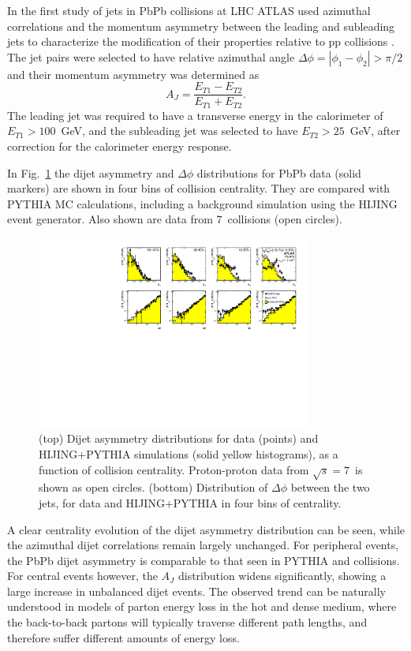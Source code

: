 In the first study of jets in PbPb collisions at LHC ATLAS used azimuthal correlations and the
momentum asymmetry between the leading and subleading jets to characterize the modification
of their properties relative to pp collisions \cite{Aad:2010bu}.
The jet pairs were selected to have relative azimuthal angle $\Delta \phi =|\phi_1-\phi_2| > \pi/2$
and their momentum asymmetry was determined as
\begin{equation}
A_J = \frac{E_{T1}-E_{T2}}{E_{T1}+E_{T2}}.
\end{equation}
The leading jet was required to have a transverse energy in the calorimeter of $E_{T1} > 100$~GeV,
and the subleading jet was selected to have $E_{T2} > 25$~GeV, after correction for
the calorimeter energy response.

In Fig.~\ref{fig:GR:final_4x2} the dijet asymmetry and $\Delta\phi$ distributions for PbPb data (solid markers)
are shown in four bins of collision centrality. They are compared with PYTHIA MC calculations, including a
background simulation using the HIJING event generator. Also shown are data from 7\TeV\
\pp collisions (open circles).
\begin{figure}[!thb]
\begin{center}
\includegraphics[width=0.8\textwidth]{jetfigures/final_4x2_23_newpp.pdf}
\caption{
(top) Dijet asymmetry distributions for data (points) and HIJING+PYTHIA simulations (solid yellow histograms),
as a function of collision centrality.  Proton-proton data from $\sqrt{s}=7$\TeV\ is shown as open circles.
(bottom) Distribution of $\Delta\phi$ between the two jets, for data and HIJING+PYTHIA in four bins of centrality.
\label{fig:GR:final_4x2}
}
\end{center}
\end{figure}

A clear centrality evolution of the dijet asymmetry distribution can be seen, while the azimuthal
dijet correlations remain largely unchanged. For peripheral events, the PbPb dijet asymmetry
is comparable to that seen in PYTHIA and \pp collisions. For central events however,
the $A_J$ distribution widens significantly, showing a large increase in unbalanced
dijet events. The observed trend can be naturally understood in models of parton energy
loss in the hot and dense medium, where the back-to-back partons will typically traverse
different path lengths, and therefore suffer different amounts of energy loss.

